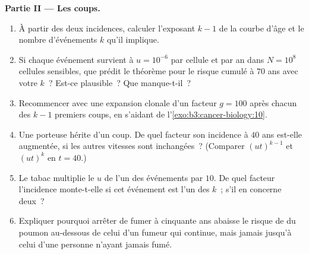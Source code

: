 \begin{problem}
\medskip
\noindent\textbf{Partie II --- Les coups.}
\begin{enumerate}[resume]
  \item À partir des deux incidences, calculer l'exposant $k - 1$ de la
        courbe d'âge et le nombre d'événements $k$ qu'il implique.
  \item Si chaque événement survient à $u = 10^{-6}$ par cellule et par
        an dans $N = 10^{8}$ cellules sensibles, que prédit le théorème
        pour le risque cumulé à $70$ ans avec votre $k$~? Est-ce
        plausible~? Que manque-t-il~?
  \item Recommencer avec une expansion clonale d'un facteur $g = 100$
        après chacun des $k - 1$ premiers coups, en s'aidant de
        l'\cref{exo:b3:cancer-biology:10}.
  \item Une porteuse hérite d'un coup. De quel facteur son incidence à
        $40$ ans est-elle augmentée, si les autres vitesses sont
        inchangées~? (Comparer $(ut)^{k-1}$ et $(ut)^{k}$ en
        $t = 40$.)
  \item Le tabac multiplie le $u$ de l'un des événements par $10$. De
        quel facteur l'incidence monte-t-elle si cet événement est l'un
        des $k$~; s'il en concerne deux~?
  \item Expliquer pourquoi arrêter de fumer à cinquante ans abaisse le
        risque de  du poumon au-dessous de celui d'un fumeur qui
        continue, mais jamais jusqu'à celui d'une personne n'ayant
        jamais fumé.
\end{enumerate}


\end{problem}
